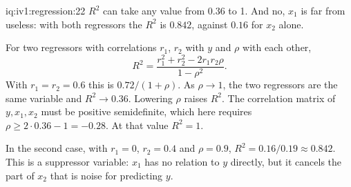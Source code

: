\begin{solution}{iq:iv1:regression:22}
$R^2$ can take any value from $0.36$ to 1. And no, $x_1$ is far from useless: with both regressors the $R^2$ is $0.842$, against $0.16$ for $x_2$ alone.

For two regressors with correlations $r_1$, $r_2$ with $y$ and $\rho$ with each other,
\[
R^2 = \frac{r_1^2 + r_2^2 - 2 r_1 r_2 \rho}{1 - \rho^2} .
\]
With $r_1 = r_2 = 0.6$ this is $0.72/(1 + \rho)$. As $\rho \to 1$, the two regressors are the same variable and $R^2 \to 0.36$. Lowering $\rho$ raises $R^2$. The correlation matrix of $y, x_1, x_2$ must be positive semidefinite, which here requires $\rho \ge 2 \cdot 0.36 - 1 = -0.28$. At that value $R^2 = 1$.

In the second case, with $r_1 = 0$, $r_2 = 0.4$ and $\rho = 0.9$, $R^2 = 0.16/0.19 \approx 0.842$. This is a suppressor variable: $x_1$ has no relation to $y$ directly, but it cancels the part of $x_2$ that is noise for predicting $y$.

\end{solution}

